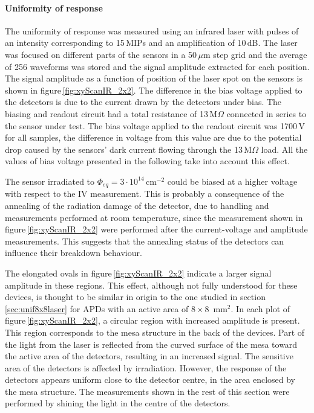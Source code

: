 \documentclass[review,number,sort&compress]{elsarticle}
\begin{document}
\paragraph{Uniformity of response}
The uniformity of response was measured using an infrared laser with pulses of an intensity corresponding to 15\,MIPs and an amplification of 10\,dB.
The laser was focused on different parts of the sensors in a 50\,$\mu$m step grid and the average of 256 waveforms was stored and the signal amplitude extracted for each position.
The signal amplitude as a function of position of the laser spot on the sensors is shown in figure\,\ref{fig:xyScanIR_2x2}.
The difference in the bias voltage applied to the detectors is due to the current drawn by the detectors under bias.
The biasing and readout circuit had a total resistance of 13\,M$\Omega$ connected in series to the sensor under test.
The bias voltage applied to the readout circuit was 1700\,V for all samples, the difference in voltage from this value are due to the potential drop caused by the sensors' dark current flowing through the 13\,M$\Omega$ load.
All the values of bias voltage presented in the following take into account this effect.

The sensor irradiated to $\Phi_{eq} = 3 \cdot 10^{14}$\,cm$^{-2}$ could be biased at a higher voltage with respect to the IV measurement.
This is probably a consequence of the annealing of the radiation damage of the detector, due to handling and measurements performed at room temperature, since the measurement shown in figure\,\ref{fig:xyScanIR_2x2} were performed after the current-voltage and amplitude measurements.
This suggests that the annealing status of the detectors can influence their breakdown behaviour.

The elongated ovals in figure\,\ref{fig:xyScanIR_2x2} indicate a larger signal amplitude in these regions.
This effect, although not fully understood for these devices, is thought to be similar in origin to the one studied in section\,\ref{sec:unif8x8laser} for APDs with an active area of $8 \times 8$~mm$^2$.
In each plot of figure\,\ref{fig:xyScanIR_2x2}, a circular region with increased amplitude is present.
This region corresponds to the mesa structure in the back of the devices.
Part of the light from the laser is reflected from the curved surface of the mesa toward the active area of the detectors, resulting in an increased signal.
The sensitive area of the detectors is affected by irradiation.
However, the response of the detectors appears uniform close to the detector centre, in the area enclosed by the mesa structure.
The measurements shown in the rest of this section were performed by shining the light in the centre of the detectors.
\end{document}
